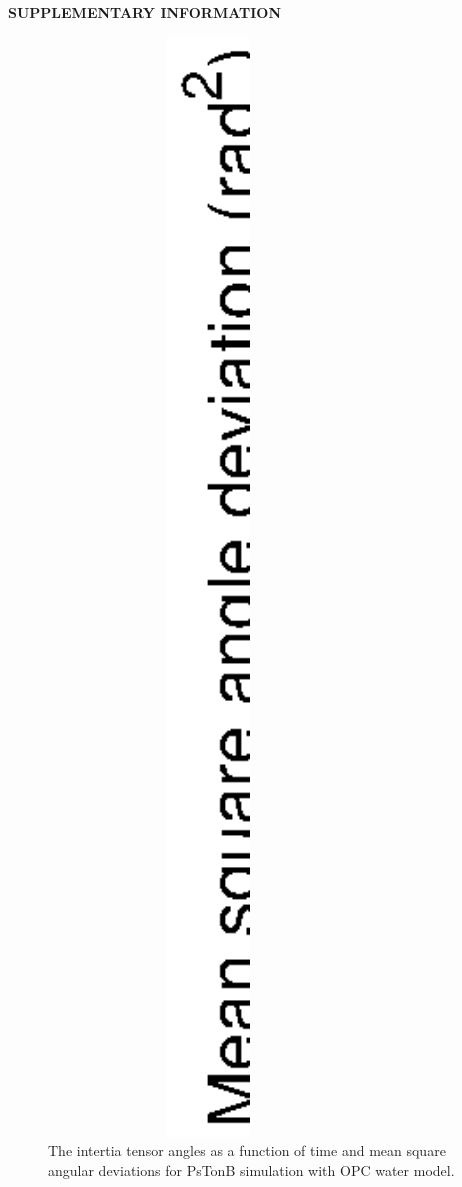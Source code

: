 \documentclass[pre,aps,floatfix,authordate1-4,twocolumn]{revtex4-1}
\begin{document}


\begin{center}
{\bf SUPPLEMENTARY INFORMATION}
\end{center}
\begin{figure}[!h]
  \includegraphics[width=8.5cm]{../Figs/RMASDplotLOG.eps}%
  \caption{The intertia tensor angles as a function of time and mean square angular
    deviations for PsTonB simulation with OPC water model.
    \label{RMASDplotLOG}}%
\end{figure}

\end{document}
